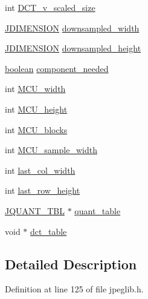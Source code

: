 \begin{DoxyCompactItemize}
int \mbox{\hyperlink{structjpeg__component__info_a8099359745c7887abe9158cf5655b5f3}{D\+C\+T\+\_\+v\+\_\+scaled\+\_\+size}}
\item 
\mbox{\hyperlink{jmorecfg_8h_a04ed4674f6f1d0d50ec241531e38274f}{J\+D\+I\+M\+E\+N\+S\+I\+ON}} \mbox{\hyperlink{structjpeg__component__info_aacbe6c10eca470c8ec331f91be8cccee}{downsampled\+\_\+width}}
\item 
\mbox{\hyperlink{jmorecfg_8h_a04ed4674f6f1d0d50ec241531e38274f}{J\+D\+I\+M\+E\+N\+S\+I\+ON}} \mbox{\hyperlink{structjpeg__component__info_a019811f4bcc16fe481e0b53f659b281e}{downsampled\+\_\+height}}
\item 
\mbox{\hyperlink{jmorecfg_8h_a7c6368b321bd9acd0149b030bb8275ed}{boolean}} \mbox{\hyperlink{structjpeg__component__info_a8f9efa098849cd087e20d536b05d4798}{component\+\_\+needed}}
\item 
int \mbox{\hyperlink{structjpeg__component__info_a82a5bababd81410839aefec8a61878de}{M\+C\+U\+\_\+width}}
\item 
int \mbox{\hyperlink{structjpeg__component__info_a09baec129e44114d46d5b19dc98b0105}{M\+C\+U\+\_\+height}}
\item 
int \mbox{\hyperlink{structjpeg__component__info_ad9b901306395808c7eb338148e30c2cd}{M\+C\+U\+\_\+blocks}}
\item 
int \mbox{\hyperlink{structjpeg__component__info_aca7e52dcd78bb2fe51104e2add9dade5}{M\+C\+U\+\_\+sample\+\_\+width}}
\item 
int \mbox{\hyperlink{structjpeg__component__info_a440612272e3e9eac0a240fd34cde5bbe}{last\+\_\+col\+\_\+width}}
\item 
int \mbox{\hyperlink{structjpeg__component__info_a7d0738ae3647a019722410a2d718f3d3}{last\+\_\+row\+\_\+height}}
\item 
\mbox{\hyperlink{structJQUANT__TBL}{J\+Q\+U\+A\+N\+T\+\_\+\+T\+BL}} $\ast$ \mbox{\hyperlink{structjpeg__component__info_afd551e8e9dbc3f3076c10cd4d391fdac}{quant\+\_\+table}}
\item 
void $\ast$ \mbox{\hyperlink{structjpeg__component__info_a9f68a39fc17561866668c1b9d4a8f238}{dct\+\_\+table}}
\end{DoxyCompactItemize}


\subsection{Detailed Description}


Definition at line 125 of file jpeglib.\+h.



